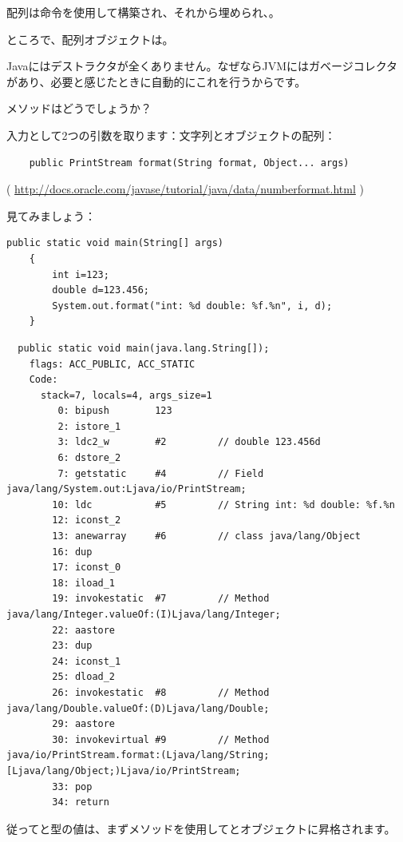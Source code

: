 配列は命令を使用して構築され、それから埋められ、。


ところで、配列オブジェクトは。

Javaにはデストラクタが全くありません。なぜならJVMにはガベージコレクタがあり、必要と感じたときに自動的にこれを行うからです。


メソッドはどうでしょうか？

入力として2つの引数を取ります：文字列とオブジェクトの配列：


\begin{lstlisting}
	public PrintStream format(String format, Object... args)
\end{lstlisting}
( \url{http://docs.oracle.com/javase/tutorial/java/data/numberformat.html} )

見てみましょう：

\begin{lstlisting}[style=customjava]
	public static void main(String[] args)
	{
		int i=123;
		double d=123.456;
		System.out.format("int: %d double: %f.%n", i, d);
	}
\end{lstlisting}

\begin{lstlisting}
  public static void main(java.lang.String[]);
    flags: ACC_PUBLIC, ACC_STATIC
    Code:
      stack=7, locals=4, args_size=1
         0: bipush        123
         2: istore_1      
         3: ldc2_w        #2         // double 123.456d
         6: dstore_2      
         7: getstatic     #4         // Field java/lang/System.out:Ljava/io/PrintStream;
        10: ldc           #5         // String int: %d double: %f.%n
        12: iconst_2      
        13: anewarray     #6         // class java/lang/Object
        16: dup           
        17: iconst_0      
        18: iload_1       
        19: invokestatic  #7         // Method java/lang/Integer.valueOf:(I)Ljava/lang/Integer;
        22: aastore       
        23: dup           
        24: iconst_1      
        25: dload_2       
        26: invokestatic  #8         // Method java/lang/Double.valueOf:(D)Ljava/lang/Double;
        29: aastore       
        30: invokevirtual #9         // Method java/io/PrintStream.format:(Ljava/lang/String;[Ljava/lang/Object;)Ljava/io/PrintStream;
        33: pop           
        34: return        
\end{lstlisting}

従ってと型の値は、まずメソッドを使用してとオブジェクトに昇格されます。

